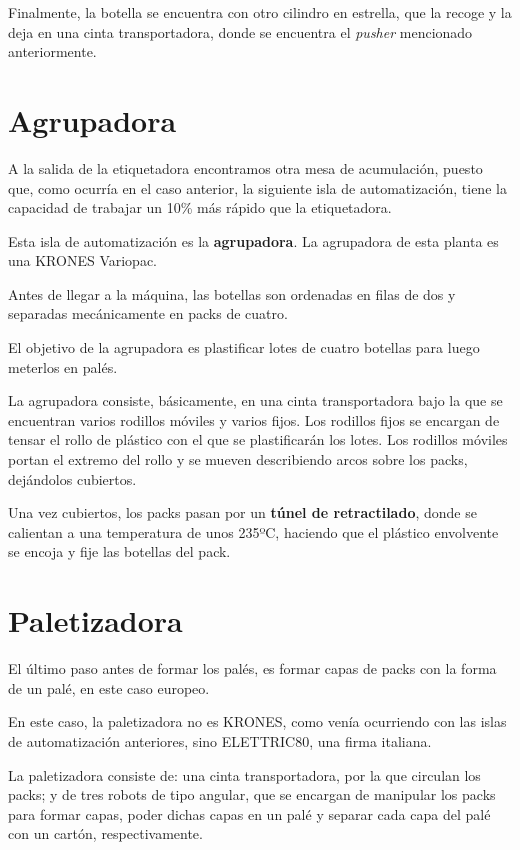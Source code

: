 \documentclass[11pt,a4paper,spanish,twoside]{report}
\begin{document}
Finalmente, la botella se encuentra con otro cilindro en estrella, que la
recoge y la deja en una cinta transportadora, donde se encuentra el 
\emph{\emph{pusher}} mencionado anteriormente.

\section{Agrupadora}
A la salida de la etiquetadora encontramos otra mesa de acumulación, puesto 
que, como ocurría en el caso anterior, la siguiente isla de automatización, 
tiene la capacidad de trabajar un 10\% más rápido que la etiquetadora.

Esta isla de automatización es la \textbf{agrupadora}. La agrupadora de esta 
planta es una KRONES Variopac.

Antes de llegar a la máquina, las botellas son ordenadas en filas de dos y 
separadas mecánicamente en packs de cuatro. 

El objetivo de la agrupadora es plastificar lotes de cuatro botellas para
luego meterlos en palés.

La agrupadora consiste, básicamente, en una cinta transportadora bajo la que 
se encuentran varios rodillos móviles y varios fijos. Los rodillos fijos se 
encargan de tensar el rollo de plástico con el que se plastificarán los lotes.
Los rodillos móviles portan el extremo del rollo y se mueven describiendo 
arcos sobre los packs, dejándolos cubiertos.

Una vez cubiertos, los packs pasan por un \textbf{túnel de retractilado}, 
donde se calientan a una temperatura de unos 235ºC, haciendo que el plástico
envolvente se encoja y fije las botellas del pack.

\section{Paletizadora}
El último paso antes de formar los palés, es formar capas de packs con la 
forma de un palé, en este caso europeo.

En este caso, la paletizadora no es KRONES, como venía ocurriendo con las 
islas de automatización anteriores, sino ELETTRIC80, una firma italiana.

La paletizadora consiste de: una cinta transportadora, por la que circulan los
packs; y de tres robots de tipo angular, que se encargan de manipular los 
packs para formar capas, poder dichas capas en un palé y separar cada capa del 
palé con un cartón, respectivamente.
\end{document}
